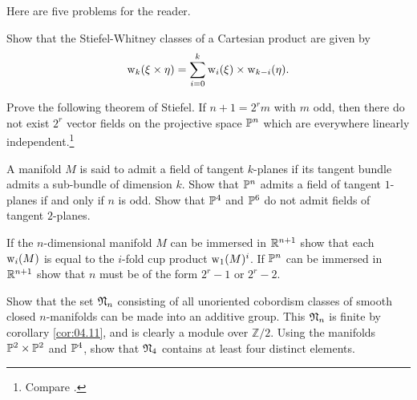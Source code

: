\documentclass[../main]{subfiles}
\begin{document}
\noindent Here are five problems for the reader.
\begin{problem}
\label{prob:04.01}
Show that the Stiefel-Whitney classes of a Cartesian
	product are given by 
	\[\operatorname{w}_k(\xi\times \eta)=\sum_{i=0}^k \operatorname{w}_i(\xi)\times \operatorname{w}_{k-i}(\eta).\]
\end{problem}
\begin{problem}
\label{prob:04.02}
Prove the following theorem of Stiefel. If $n + 1 = 2^r m$ with $m$ odd, then there do not exist $2^r$ vector fields on the projective space $\mathbb{P}^{n}$ which are everywhere linearly independent.\footnote{Compare \cite{stiefel1936, steenrodwhitehead1951, adams1962}.}
\end{problem}
\begin{problem}
\label{prob:04.03}
A manifold $M$ is said to admit a field of tangent $k$-planes if its tangent bundle admits a sub-bundle of dimension $k$. Show that $\mathbb{P}^{n}$ admits a field of tangent $1$-planes if and only if $n$ is odd. Show that $\mathbb{P}^{4}$ and $\mathbb{P}^{6}$ do not admit fields of tangent $2$-planes.
\end{problem}
\begin{problem}
\label{prob:04.04}
If the $n$-dimensional manifold $M$ can be immersed in $\mathbb R^{n+1}$ show that each $\operatorname{w}_i(M)$ is equal to the $i$-fold cup product $\operatorname{w}_1(M)^i$. If $\mathbb{P}^{n}$ can be immersed in $\mathbb R^{n+1}$ show that $n$ must be of the form	$2^r-1$ or $2^r-2$.
\end{problem}
\begin{problem}
\label{prob:04.05}
Show that the set $\mathfrak{N}_n$ consisting of all unoriented cobordism classes of smooth closed $n$-manifolds can be made into an additive group. This  $\mathcal{\mathfrak{N}}_n$ is finite by corollary \ref{cor:04.11}, and is clearly a module over $\mathbb{Z}/2$. Using the manifolds $\mathbb{P}^{2}\times\mathbb{P}^{2}$ and $\mathbb{P}^{4}$, show that $\mathfrak{N}_4$ contains at least four distinct elements.
\end{problem}
\end{document}
